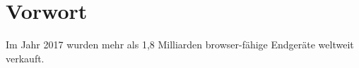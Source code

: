 \chapter*{Vorwort}
\label{cha:Vorwort}

Im Jahr 2017 wurden mehr als 1,8 Milliarden browser-fähige Endgeräte weltweit verkauft. 